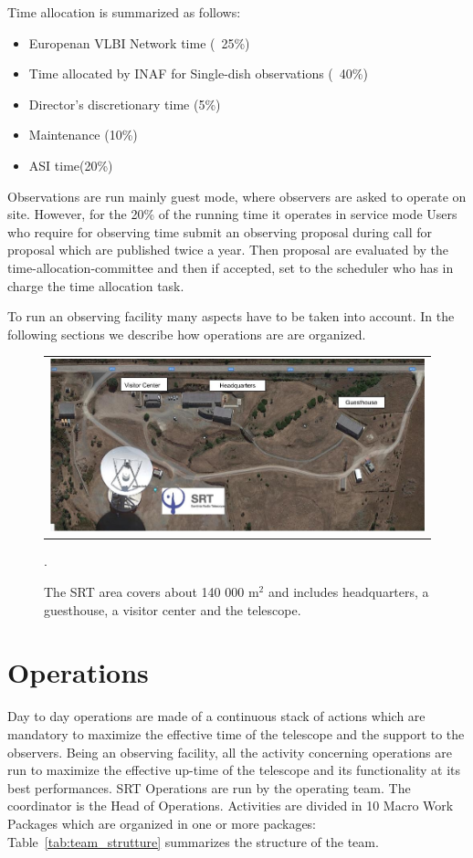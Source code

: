 \documentclass[a4paper]{spie}  %
\begin{document}
Time allocation is summarized as follows:
\begin{itemize}
    \item Europenan VLBI Network time (~25\%)
    \item Time allocated by INAF for Single-dish observations (~40\%)
    \item Director's discretionary time (5\%)
    \item Maintenance (10\%)
    \item ASI time(20\%)
\end{itemize}

Observations are run mainly guest mode, where observers are asked to operate on site. However, for the 20\% of the running time it operates in service mode 
Users who require for observing time submit an observing proposal during call for proposal which are published twice a year. Then proposal are evaluated by the time-allocation-committee and then if accepted, set to the scheduler who has in charge the time allocation task. 

To run an observing facility many aspects have to be taken into account. In the following sections we describe how operations are are organized. 

\begin{figure} [hbt!]
   \begin{center}
   \begin{tabular}{c} 
   \includegraphics[width=1.0\textwidth]{srt_site.png}
	\end{tabular}
	\end{center}
   \caption[example] 
   { \label{fig:srt_site} 
The SRT area covers about 140 000 m$^2$ and includes headquarters, a guesthouse, a visitor center and the telescope.  }.
   \end{figure} 

\section{Operations}
Day to day operations are made of a continuous stack of actions which are mandatory  to maximize the effective time of the telescope and the support to the observers. Being an observing facility, all the activity concerning operations  are run to maximize the effective up-time of the telescope and its functionality at its best performances.
SRT Operations are run by the operating team. The coordinator is the Head of Operations. 
Activities are divided in 10 Macro Work Packages which are organized in one or more packages:
Table~\ref{tab:team_strutture} summarizes the structure of the team. 
\end{document}
